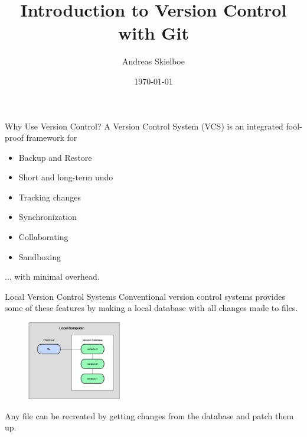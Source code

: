 \documentclass{beamer}
\title[Git - Version Control System]{Introduction  to Version Control with Git}
\author{Andreas Skielboe}
\institute{Dark Cosmology Centre \\ Niels Bohr Institute}
\date{\today}
\def \figureHeight {130px}
\begin{document}
\begin{frame}
	\titlepage
\end{frame}

\begin{frame}{Why Use Version Control?}
	A Version Control System (VCS) is an integrated fool-proof framework for
	\begin{itemize}
		\item Backup and Restore
		\item Short and long-term undo
		\item Tracking changes
		\item Synchronization
		\item Collaborating
		\item Sandboxing
	\end{itemize}
	... with minimal overhead.
\end{frame}

\begin{frame}{Local Version Control Systems}
	Conventional version control systems provides some of these features by making a local database with all changes made to files.
	\begin{figure}
 	  \includegraphics[height=\figureHeight]{images/local-version-control.png}
	\end{figure}
	Any file can be recreated by getting changes from the database and patch them up.
\end{frame}
\end{document}
